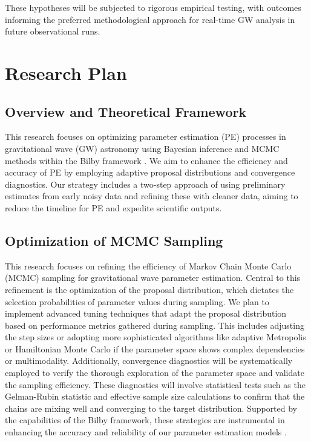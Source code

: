 \documentclass[12pt]{article}
\begin{document}
These hypotheses will be subjected to rigorous empirical testing, with outcomes informing the preferred methodological approach for real-time GW analysis in future observational runs.




\section{Research Plan}
\subsection*{Overview and Theoretical Framework}

This research focuses on optimizing parameter estimation (PE) processes in gravitational wave (GW) astronomy using Bayesian inference and MCMC methods within the Bilby framework \cite{Bilby-MCMC, Bilby: A user-friendly}. We aim to enhance the efficiency and accuracy of PE by employing adaptive proposal distributions and convergence diagnostics. Our strategy includes a two-step approach of using preliminary estimates from early noisy data and refining these with cleaner data, aiming to reduce the timeline for PE and expedite scientific outputs.




\subsection{Optimization of MCMC Sampling}

This research focuses on refining the efficiency of Markov Chain Monte Carlo (MCMC) sampling for gravitational wave parameter estimation. Central to this refinement is the optimization of the proposal distribution, which dictates the selection probabilities of parameter values during sampling. We plan to implement advanced tuning techniques that adapt the proposal distribution based on performance metrics gathered during sampling. This includes adjusting the step sizes or adopting more sophisticated algorithms like adaptive Metropolis or Hamiltonian Monte Carlo if the parameter space shows complex dependencies or multimodality. Additionally, convergence diagnostics will be systematically employed to verify the thorough exploration of the parameter space and validate the sampling efficiency. These diagnostics will involve statistical tests such as the Gelman-Rubin statistic and effective sample size calculations to confirm that the chains are mixing well and converging to the target distribution. Supported by the capabilities of the Bilby framework, these strategies are instrumental in enhancing the accuracy and reliability of our parameter estimation models \cite{Bilby-MCMC, Smith2016}.
\end{document}
